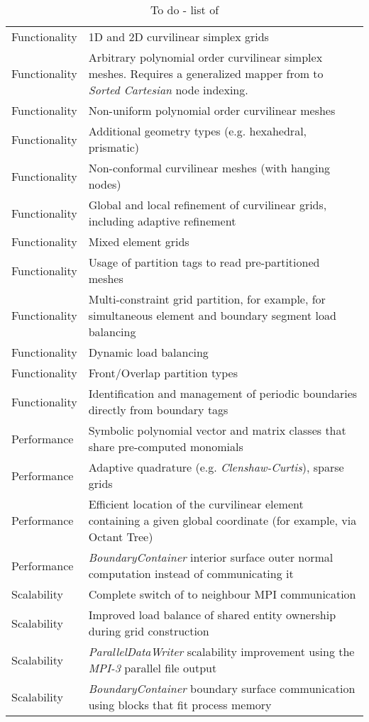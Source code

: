\begin{flushleft}
\begin{table}
\begin{tabularx}{\textwidth}{@{}| l X |@{}}
\hline
Functionality & 1D and 2D curvilinear simplex grids \\
Functionality & Arbitrary polynomial order curvilinear simplex meshes. Requires a generalized mapper from \gmsh{} to \textit{Sorted Cartesian} node indexing. \\
Functionality & Non-uniform polynomial order curvilinear meshes \\
Functionality & Additional geometry types (e.g. hexahedral, prismatic) \\
Functionality & Non-conformal curvilinear meshes (with hanging nodes) \\
Functionality & Global and local refinement of curvilinear grids, including adaptive refinement \\
Functionality & Mixed element grids \\
Functionality & Usage of \gmsh{} partition tags to read pre-partitioned meshes \\
Functionality & Multi-constraint grid partition, for example, for simultaneous element and boundary segment load balancing \\
Functionality & Dynamic load balancing \\
Functionality & Front/Overlap partition types \\
Functionality & Identification and management of periodic boundaries directly from boundary tags \\
Performance & Symbolic polynomial vector and matrix classes that share pre-computed monomials \\
Performance & Adaptive quadrature (e.g. \textit{Clenshaw-Curtis}), sparse grids \cite{petras2000} \\
Performance & Efficient location of the curvilinear element containing a given global coordinate (for example, via Octant Tree) \\
Performance & \textit{BoundaryContainer} interior surface outer normal computation instead of communicating it  \\
Scalability & Complete switch of \curvgrid{} to neighbour MPI communication \\
Scalability & Improved load balance of shared entity ownership during grid construction \\
Scalability & \textit{ParallelDataWriter} scalability improvement using the \textit{MPI-3} parallel file output  \\
Scalability & \textit{BoundaryContainer} boundary surface communication using blocks that fit process memory \\
\hline
\end{tabularx}
\caption{To do - list of \curvgrid{}}
\label{table:conclusion:todolist}
\end{table}
\end{flushleft}



